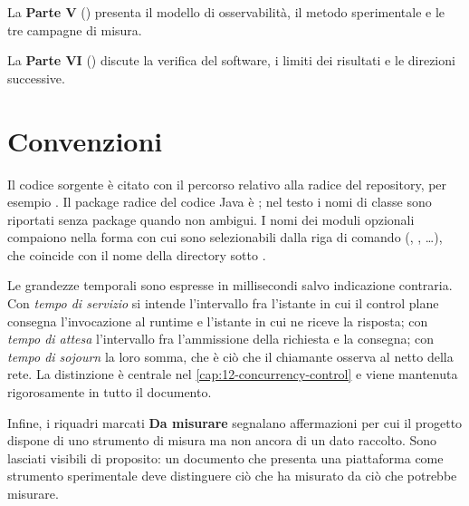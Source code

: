 La \textbf{Parte V} ()
presenta il modello di osservabilit\`a, il metodo sperimentale e le tre
campagne di misura.

La \textbf{Parte VI} ()
discute la verifica del software, i limiti dei risultati e le direzioni
successive.

\section{Convenzioni}

Il codice sorgente \`e citato con il percorso relativo alla radice del
repository, per esempio . Il
package radice del codice Java \`e ; nel testo i
nomi di classe sono riportati senza package quando non ambigui. I nomi dei
moduli opzionali compaiono nella forma con cui sono selezionabili dalla riga di
comando (, , \ldots), che coincide
con il nome della directory sotto .

Le grandezze temporali sono espresse in millisecondi salvo indicazione contraria.
Con \emph{tempo di servizio} si intende l'intervallo fra l'istante in cui il
control plane consegna l'invocazione al runtime e l'istante in cui ne riceve la
risposta; con \emph{tempo di attesa} l'intervallo fra l'ammissione della
richiesta e la consegna; con \emph{tempo di sojourn} la loro somma, che \`e ci\`o
che il chiamante osserva al netto della rete. La distinzione \`e centrale nel
\cref{cap:12-concurrency-control} e viene mantenuta rigorosamente in tutto il
documento.

Infine, i riquadri marcati \textbf{Da misurare} segnalano affermazioni per cui
il progetto dispone di uno strumento di misura ma non ancora di un dato
raccolto. Sono lasciati visibili di proposito: un documento che presenta una
piattaforma come strumento sperimentale deve distinguere ci\`o che ha misurato
da ci\`o che potrebbe misurare.
